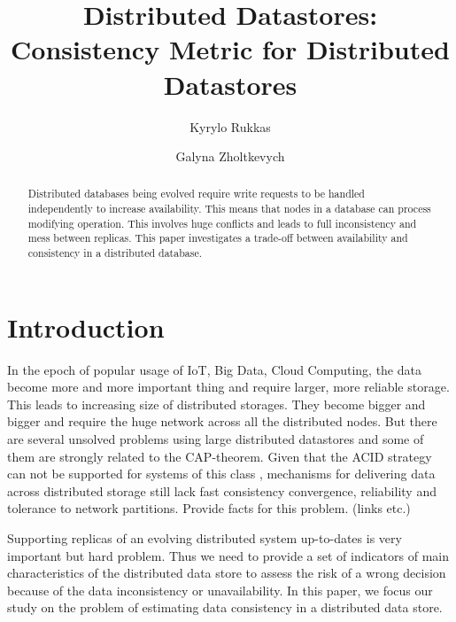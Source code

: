 \documentclass{llncs}
\begin{document}
\title{Distributed Datastores: Consistency Metric for Distributed Datastores}
\author{Kyrylo Rukkas\and Galyna Zholtkevych}
\maketitle
\begin{abstract}
Distributed databases being evolved require write requests to be handled independently to increase availability.
This means that nodes in a database can process modifying operation. This involves huge conflicts and leads to
full inconsistency and mess between replicas. This paper investigates a trade-off between availability and consistency
in a distributed database.
\end{abstract}

\section{Introduction}\label{sec:intro}
In the epoch of popular usage of IoT, Big Data, Cloud Computing, the data become more and more
important thing and require larger, more reliable storage. This leads to increasing size of distributed
storages. They become bigger and bigger and require the huge network across all the distributed nodes.
But there are several unsolved problems using large distributed datastores and some of them are strongly related
to the CAP-theorem. Given that the ACID strategy can not be supported for systems of this class \cite[{\color{red} references to the CAP-conjecture})]{?}, mechanisms for delivering data across distributed storage still lack fast consistency convergence, reliability and tolerance to network partitions.
{\color{red}
Provide facts for this problem. (links etc.)
}


Supporting replicas of an evolving distributed system up-to-dates is very important but hard problem. Thus we need to provide a set of indicators of main characteristics of the distributed data store to assess the risk of a wrong decision because of the data inconsistency or unavailability.
In this paper, we focus our study on the problem of estimating data consistency in a distributed data store.
\end{document}
